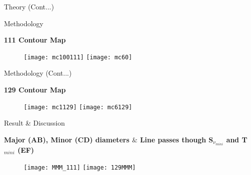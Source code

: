 \documentclass[12pt,a4paper]{beamer}
\begin{document}
\begin{frame}{Theory (Cont...)}
\begin{frame}{Methodology}
\begin{block}{\centering\textbf{111 Contour Map \vspace*{.5cm}}}
\begin{itemize}
\begin{figure}[h]
\vspace{0.0cm} \centering
\texttt{[image: mc100111]}
\texttt{[image: mc60]}
\end{figure}
\end{itemize}
\end{block}
\end{frame}

\begin{frame}{Methodology (Cont...)}
\begin{block}{\centering\textbf{129 Contour Map \vspace*{.5cm}}}
\begin{itemize}
\begin{figure}[h]
\vspace{0.0cm} \centering
\texttt{[image: mc1129]}
\texttt{[image: mc6129]}
\end{figure}
\end{itemize}
\end{block}
\end{frame}


\begin{frame}
\begin{center}
\Large\bf\color{red}{Result \& Discussion}
\end{center}
\end{frame}

\begin{frame}{Result \& Discussion}
\begin{block}{\centering\textbf{Major (AB), Minor (CD) diameters $\&$ Line passes though S$_{\nu}_{mini}$ and T$_{mini}$ (EF) \vspace*{.05cm}}}
\begin{itemize}
\begin{figure}[h]
\vspace{0.0cm} \centering
\texttt{[image: MMM\_111]}
\texttt{[image: 129MMM]}
\end{figure}
\end{itemize}
\end{block}
\end{frame}



\end{frame}
\end{document}
